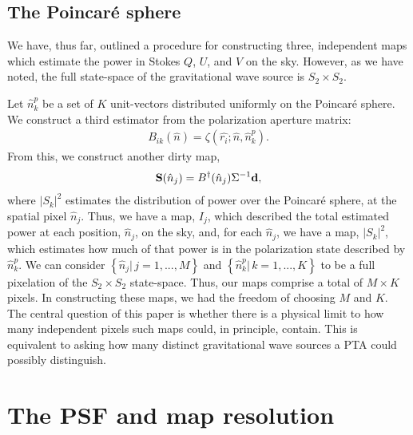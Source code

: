 \documentclass[%
 reprint,
nofootinbib,
 amsmath,amssymb,
 aps,
]{revtex4-2}
\begin{document}
\subsection{\label{sec:pcsphere}The Poincar\'e sphere} 

We have, thus far, outlined a procedure for constructing three, independent maps which estimate the power in Stokes $Q$, $U$, and $V$ on the sky. However, as we have noted, the full state-space of the gravitational wave source is $S_2 \times S_2$. 

Let $\hat{n}^{p}_{k}$ be a set of $K$ unit-vectors distributed uniformly on the Poincar\'e sphere. We construct a third estimator from the polarization aperture matrix:
\begin{align}
    B_{ik}(\hat{n}) = \zeta(\hat{r_i};\hat{n},\hat{n}^{p}_{k}).
\end{align}
From this, we construct another dirty map,
\begin{align}
    {\bf S}(\hat{n}_j) = B^\dagger(\hat{n}_j) \Sigma^{-1} {\bf d},
\end{align}
where $|S_k|^2$ estimates the distribution of power over the Poincar\'e sphere, at the spatial pixel $\hat{n}_j$. Thus, we have a map, $I_j$, which described the total estimated power at each position, $\hat{n}_j$, on the sky, and, for each $\hat{n}_j$, we have a map, $|S_k|^2$, which estimates how much of that power is in the polarization state described by $\hat{n}^{p}_{k}$. We can consider $\left\{ \hat{n}_j | \, j=1,...,M \right\}$ and $\left\{ \hat{n}^{p}_{k} | \, k=1,...,K \right\}$ to be a full pixelation of the $S_2 \times S_2$ state-space. Thus, our maps comprise a total of $M \times K$ pixels. In constructing these maps, we had the freedom of choosing $M$ and $K$. The central question of this paper is whether there is a physical limit to how many independent pixels such maps could, in principle, contain. This is equivalent to asking how many distinct gravitational wave sources a PTA could possibly distinguish.


\section{The PSF and map resolution}
\label{sec:resolution}
\end{document}
